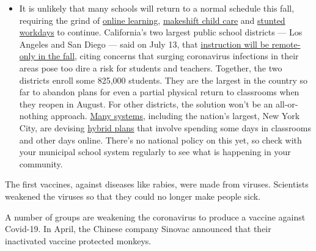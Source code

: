 \begin{itemize}
  \begin{itemize}
  \tightlist
  \item
    It is unlikely that many schools will return to a normal schedule
    this fall, requiring the grind of
    \href{https://www.nytimes.com/2020/06/05/us/coronavirus-education-lost-learning.html?action=click\&pgtype=Article\&state=default\&region=MAIN_CONTENT_3\&context=storylines_faq}{online
    learning},
    \href{https://www.nytimes.com/2020/05/29/us/coronavirus-child-care-centers.html?action=click\&pgtype=Article\&state=default\&region=MAIN_CONTENT_3\&context=storylines_faq}{makeshift
    child care} and
    \href{https://www.nytimes.com/2020/06/03/business/economy/coronavirus-working-women.html?action=click\&pgtype=Article\&state=default\&region=MAIN_CONTENT_3\&context=storylines_faq}{stunted
    workdays} to continue. California's two largest public school
    districts --- Los Angeles and San Diego --- said on July 13, that
    \href{https://www.nytimes.com/2020/07/13/us/lausd-san-diego-school-reopening.html?action=click\&pgtype=Article\&state=default\&region=MAIN_CONTENT_3\&context=storylines_faq}{instruction
    will be remote-only in the fall}, citing concerns that surging
    coronavirus infections in their areas pose too dire a risk for
    students and teachers. Together, the two districts enroll some
    825,000 students. They are the largest in the country so far to
    abandon plans for even a partial physical return to classrooms when
    they reopen in August. For other districts, the solution won't be an
    all-or-nothing approach.
    \href{https://bioethics.jhu.edu/research-and-outreach/projects/eschool-initiative/school-policy-tracker/}{Many
    systems}, including the nation's largest, New York City, are
    devising
    \href{https://www.nytimes.com/2020/06/26/us/coronavirus-schools-reopen-fall.html?action=click\&pgtype=Article\&state=default\&region=MAIN_CONTENT_3\&context=storylines_faq}{hybrid
    plans} that involve spending some days in classrooms and other days
    online. There's no national policy on this yet, so check with your
    municipal school system regularly to see what is happening in your
    community.
  \end{itemize}
\end{itemize}

The first vaccines, against diseases like rabies, were made from
viruses. Scientists weakened the viruses so that they could no longer
make people sick.

A number of groups are weakening the coronavirus to produce a vaccine
against Covid-19. In April, the Chinese company Sinovac announced that
their inactivated vaccine protected monkeys.

